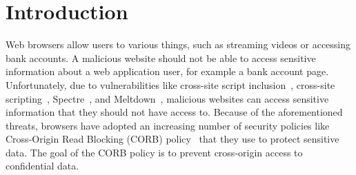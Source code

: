 \documentclass[10pt,conference]{IEEEtran}
\begin{document}

\section{Introduction}

Web browsers allow users to various things, such as streaming videos or accessing bank accounts. A malicious website should not be able to access sensitive information about a web application user, for example a bank account page. Unfortunately, due to vulnerabilities like cross-site script inclusion~\cite{hailperin_cross-site_nodate}, cross-site scripting~\cite{grossman2007xss}, Spectre~\cite{kocher2019spectre}, and Meltdown~\cite{Meltdown}, malicious websites can access sensitive information that they should not have access to. Because of the aforementioned threats, browsers have adopted an increasing number of security policies like Cross-Origin Read Blocking (CORB) policy~\cite{corb} that they use to protect sensitive data. The goal of the CORB policy is to prevent cross-origin access to confidential data. 
\end{document}
